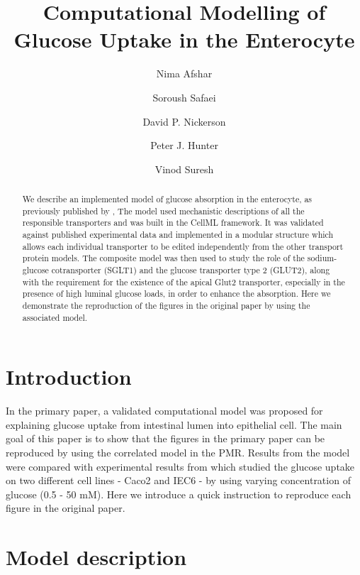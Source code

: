 \documentclass[fleqn,10pt]{physiome}
\title{Computational Modelling of Glucose Uptake in the Enterocyte}
\author[1][nima.afshar@auckland.ac.nz]{Nima Afshar}
\author[1]{Soroush Safaei}
\author[1]{David P. Nickerson}
\author[1]{Peter J. Hunter}
\author[1,2]{Vinod Suresh}
\affil[1]{Auckland Bioengineering Institute, University of Auckland,New Zealand}
\affil[2]{Department of Engineering Science, University of Auckland,New Zealand}
\begin{document}
\maketitle

\begin{abstract}
We describe an implemented model of glucose absorption in the enterocyte, as previously published by \cite{afshar2019computational}, The model used mechanistic descriptions of all the responsible transporters and was built in the CellML framework. It was validated against published experimental data and implemented in a modular structure which allows each individual transporter to be edited independently from the other transport protein models. The composite model was then used to study the role of the sodium-glucose
cotransporter (SGLT1) and the glucose transporter type 2 (GLUT2), along with the requirement for the existence of the apical Glut2 transporter, especially in the presence of high luminal glucose loads, in order to enhance the absorption. Here we demonstrate the reproduction of the figures in the original paper by using the associated model.
\end{abstract}



\section{Introduction}

In the primary paper, a validated computational model was proposed for explaining glucose uptake from intestinal lumen into epithelial cell. The main goal of this paper is to show that the figures in the primary paper can be reproduced by using the correlated model in the PMR. Results from the model were compared with experimental results from \citet{zheng2012mechanisms} which studied the glucose uptake on two different cell lines - Caco2 and IEC6 - by using varying concentration of glucose (0.5 - 50 mM).
Here we introduce a quick instruction to reproduce each figure in the original paper. 

\section{Model description}
\end{document}
